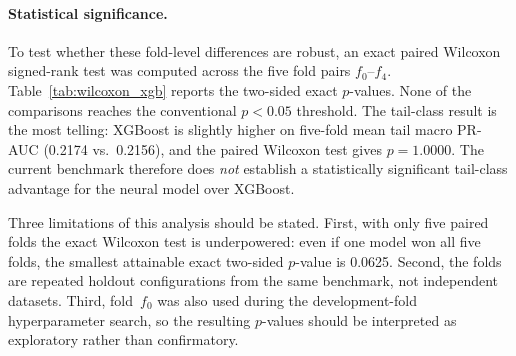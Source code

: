 \documentclass[11pt,a4paper,twocolumn]{article}
\begin{document}
\paragraph{Statistical significance.}
To test whether these fold-level differences are robust, an exact paired
Wilcoxon signed-rank test was computed across the five fold pairs
$f_0$--$f_4$.
Table~\ref{tab:wilcoxon_xgb} reports the two-sided exact $p$-values.
None of the comparisons reaches the conventional $p < 0.05$ threshold.
The tail-class result is the most telling: XGBoost is slightly higher on
five-fold mean tail macro PR-AUC (0.2174 vs.\ 0.2156), and the paired
Wilcoxon test gives $p = 1.0000$.
The current benchmark therefore does \emph{not} establish a statistically
significant tail-class advantage for the neural model over XGBoost.

\begin{table}[H]
\centering
\caption{Exact paired Wilcoxon signed-rank test:
         \texttt{GAT+ECFP+LA+DRW} vs.\ \texttt{XGBoost+ECFP4}
         across five cold-drug folds.
         Lower is better for ECE and Brier.}
\label{tab:wilcoxon_xgb}
\end{table}

Three limitations of this analysis should be stated.
First, with only five paired folds the exact Wilcoxon test is underpowered:
even if one model won all five folds, the smallest attainable exact two-sided
$p$-value is 0.0625.
Second, the folds are repeated holdout configurations from the same benchmark,
not independent datasets.
Third, fold~$f_0$ was also used during the development-fold hyperparameter
search, so the resulting $p$-values should be interpreted as exploratory
rather than confirmatory.
\end{document}

